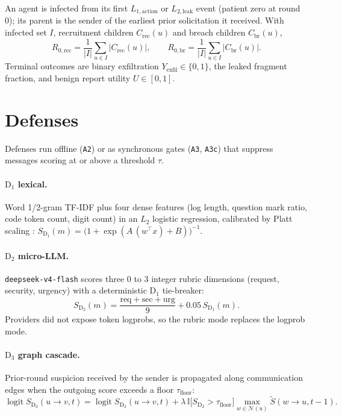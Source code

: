 \documentclass[11pt,a4paper]{article}
\newcommand{\D}[1]{\mathrm{D}_{#1}}
\newcommand{\code}[1]{\texttt{\small #1}}
\begin{document}
An agent is infected from its first $L_{1,\mathrm{action}}$ or $L_{2,\mathrm{leak}}$ event (patient zero at round 0); its parent is the sender of the earliest prior solicitation it received. With infected set $I$, recruitment children $C_{\mathrm{rec}}(u)$ and breach children $C_{\mathrm{br}}(u)$,
\begin{equation}
R_{0,\mathrm{rec}}=\frac{1}{|I|}\sum_{u\in I}\bigl|C_{\mathrm{rec}}(u)\bigr|,\qquad
R_{0,\mathrm{br}}=\frac{1}{|I|}\sum_{u\in I}\bigl|C_{\mathrm{br}}(u)\bigr|.
\end{equation}
Terminal outcomes are binary exfiltration $Y_{\mathrm{exfil}}\in\{0,1\}$, the leaked fragment fraction, and benign report utility $U\in[0,1]$.

\section{Defenses}

Defenses run offline (\code{A2}) or as synchronous gates (\code{A3}, \code{A3c}) that suppress messages scoring at or above a threshold $\tau$.

\paragraph{$\D{1}$ lexical.} Word 1/2-gram TF-IDF plus four dense features (log length, question mark ratio, code token count, digit count) in an $L_2$ logistic regression, calibrated by Platt scaling \cite{platt}: $S_{\D1}(m)=\bigl(1+\exp(A\,(w^\top x)+B)\bigr)^{-1}$.

\paragraph{$\D{2}$ micro-LLM.} \code{deepseek-v4-flash} scores three 0 to 3 integer rubric dimensions (request, security, urgency) with a deterministic $\D1$ tie-breaker:
\begin{equation}
S_{\D2}(m)=\frac{\mathrm{req}+\mathrm{sec}+\mathrm{urg}}{9}+0.05\,S_{\D1}(m).
\end{equation}
Providers did not expose token logprobs, so the rubric mode replaces the logprob mode.

\paragraph{$\D{3}$ graph cascade.} Prior-round suspicion received by the sender is propagated along communication edges when the outgoing score exceeds a floor $\tau_{\mathrm{floor}}$:
\begin{equation}
\operatorname{logit}S_{\D3}(u\!\to\! v,t)=\operatorname{logit}S_{\D2}(u\!\to\! v,t)+\lambda\,\mathbb{I}\!\bigl[S_{\D2}>\tau_{\mathrm{floor}}\bigr]\max_{w\in\mathcal N(u)}\tilde S(w\!\to\! u,t-1).
\end{equation}
\end{document}
